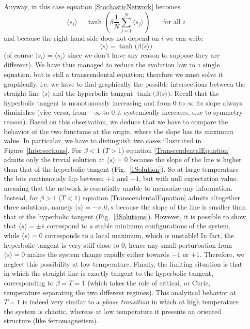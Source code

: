 Anyway, in this case equation \eqref{StochasticNetwork} becomes
\begin{equation}
\langle s_i\rangle=\tanh{\left(\beta\frac{1}{N}\sum_{j=1}^N\langle s_j\rangle\right)}\qquad\text{for all $i$}
\end{equation}
and because the right-hand side does not depend on $i$ we can write
\begin{equation}\label{TranscendentalEquation}
\langle s\rangle=\tanh{\bigl(\beta\langle s\rangle\bigr)}
\end{equation}
(of course $\langle s_i\rangle=\langle s_j\rangle$ since we don't have any reason to suppose they are different). We have thus managed to reduce the evolution law to a single equation, but is still a transcendental equation; therefore we must solve it graphically, i.e. we have to find graphically the possible intersections between the straight line $\langle s\rangle$ and the hyperbolic tangent $\tanh{\bigl(\beta\langle s\rangle\bigr)}$. Recall that the hyperbolic tangent is monotonously increasing and from 0 to $\infty$ its slope always diminishes (vice versa, from $-\infty$ to $0$ it systemically increases, due to symmetry reason). Based on this observation, we deduce that we have to compare the behavior of the two functions at the origin, where the slope has its maximum value. In particular, we have to distinguish two cases illustrated in Figure~\ref{Intersections}. For $\beta<1$ ($T>1$) equation \eqref{TranscendentalEquation} admits only the trivial solution at $\langle s\rangle=0$ because the slope of the line is higher than that of the hyperbolic tangent (Fig.~\ref{1Solution}). So at large temperature the bits continuously flip between $+1$ and $-1$, but with null expectation value, meaning that the network is essentially unable to memorize any information. Instead, for $\beta>1$ ($T<1$) equation \eqref{TranscendentalEquation} admits altogether three solutions, namely $\langle s\rangle=-\overline{s},0,\overline{s}$ because the slope of the line is smaller than that of the hyperbolic tangent (Fig.~\ref{3Solutions}). However, it is possible to show that $\langle s\rangle=\pm\overline{s}$ correspond to a stable minimum configurations of the system, while $\langle s\rangle=0$ corresponds to a local maximum, which is unstable! In fact, the hyperbolic tangent is very stiff close to 0; hence any small perturbation from $\langle s\rangle=0$ makes the system change rapidly either towards $-1$ or $+1$. Therefore, we neglect this possibility at low temperature. Finally, the limiting situation is that in which the straight line is exactly tangent to the hyperbolic tangent, corresponding to $\beta=T=1$ (which takes the role of critical, or Curie, temperature separating the two different regimes). This analytical behavior at $T=1$ is indeed very similar to a \emph{phase transition} in which at high temperature the system is chaotic, whereas at low temperature it presents an oriented structure (like ferromagnetism).
